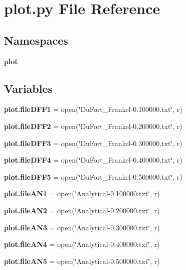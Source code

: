 \section{plot.\+py File Reference}
\label{plot_8py}
\subsection*{Namespaces}
\begin{DoxyCompactItemize}
\item 
 \textbf{ plot}
\end{DoxyCompactItemize}
\subsection*{Variables}
\begin{DoxyCompactItemize}
\item 
\textbf{ plot.\+file\+D\+F\+F1} = open(\char`\"{}Du\+Fort\+\_\+\+Frankel-\/0.\+100000.txt\char`\"{}, \textquotesingle{}r\textquotesingle{})
\item 
\textbf{ plot.\+file\+D\+F\+F2} = open(\char`\"{}Du\+Fort\+\_\+\+Frankel-\/0.\+200000.txt\char`\"{}, \textquotesingle{}r\textquotesingle{})
\item 
\textbf{ plot.\+file\+D\+F\+F3} = open(\char`\"{}Du\+Fort\+\_\+\+Frankel-\/0.\+300000.txt\char`\"{}, \textquotesingle{}r\textquotesingle{})
\item 
\textbf{ plot.\+file\+D\+F\+F4} = open(\char`\"{}Du\+Fort\+\_\+\+Frankel-\/0.\+400000.txt\char`\"{}, \textquotesingle{}r\textquotesingle{})
\item 
\textbf{ plot.\+file\+D\+F\+F5} = open(\char`\"{}Du\+Fort\+\_\+\+Frankel-\/0.\+500000.txt\char`\"{}, \textquotesingle{}r\textquotesingle{})
\item 
\textbf{ plot.\+file\+A\+N1} = open(\char`\"{}Analytical-\/0.\+100000.txt\char`\"{}, \textquotesingle{}r\textquotesingle{})
\item 
\textbf{ plot.\+file\+A\+N2} = open(\char`\"{}Analytical-\/0.\+200000.txt\char`\"{}, \textquotesingle{}r\textquotesingle{})
\item 
\textbf{ plot.\+file\+A\+N3} = open(\char`\"{}Analytical-\/0.\+300000.txt\char`\"{}, \textquotesingle{}r\textquotesingle{})
\item 
\textbf{ plot.\+file\+A\+N4} = open(\char`\"{}Analytical-\/0.\+400000.txt\char`\"{}, \textquotesingle{}r\textquotesingle{})
\item 
\textbf{ plot.\+file\+A\+N5} = open(\char`\"{}Analytical-\/0.\+500000.txt\char`\"{}, \textquotesingle{}r\textquotesingle{})

\end{DoxyCompactItemize}
